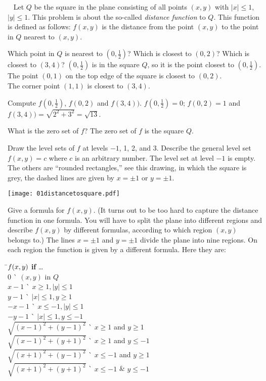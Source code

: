\begin{multicols}{2}
\problem\label{prb:distance-to-square-level-sets}
\carefulnow~
Let $Q$ be the square in the plane consisting of all points $(x,y)$
with $|x|\le1$, $|y|\le1$.  This problem is about the so-called
\emph{distance function} to $Q$.  This function is defined as
follows:  $f(x, y)$ is the distance from the point $(x,y)$ to the
point in $Q$ nearest to $(x,y)$.

\subprob Which point in $Q$ is nearest to $(0, \frac12)$?  Which is
closest to $(0, 2)$?  Which is closest to $(3,4)$?
\answer
$(0, \frac{1} {2})$ is in the square $Q$, so it is the point closest to
$(0, \frac{1} {2})$.\\
The point $(0,1)$ on the top edge of the square is closest to $(0,2)$.\\
The corner point $(1,1)$ is closest to $(3,4)$.
\endanswer

\subprob Compute $f(0, \frac12)$, $f(0,2)$ and $f(3, 4))$.
\answer
$f(0, \frac12) =0 $;
$f(0,2)=1$ and $f(3, 4))=\sqrt{2^2+3^2}=\sqrt{13}$.
\endanswer

\subprob What is the zero set of $f$?
\answer
The zero set of $f$ is the square $Q$.
\endanswer

\subprob Draw the level sets of $f$ at levels $-1$, 1, 2, and 3.  Describe
the general level set $f(x, y) = c$ where $c$ is an arbitrary number.
\answer
The level set at level $-1$ is empty.  The others are ``rounded
rectangles,'' see this drawing, in which the square is grey, the dashed
lines are given by $x=\pm1$ or $y=\pm1$.
\begin{center}
    \texttt{[image: 01distancetosquare.pdf]}
\end{center}
\endanswer

\subprob Give a formula for $f(x, y)$.  (It turns out to be too hard to
capture the distance function in one formula.  You will have to split the
plane into different regions and describe $f(x,y)$ by different formulas,
according to which region $(x,y)$ belongs to.)
\answer
The lines $x=\pm1$ and $y=\pm1$ divide the plane into nine regions.
On each region the function is given by a different formula.
Here they are:
\begin{tabbing}
\=$\boldmath{f(x, y)}$ \=\`\textbf{ if } \ldots \\
\>$0$  \>\` $(x, y)$ in $Q$\\
\>$x-1$ \>\` $x\geq1, |y|\leq 1$\\
\>$y-1$ \>\` $|x|\leq 1, y\geq1$\\
\>$-x-1$ \>\` $x\le-1, |y|\leq 1$\\
\>$-y-1$ \>\` $|x|\leq 1, y\le-1$\\
\>$\sqrt{(x-1)^2+(y-1)^2}$ \>\` $x\ge1$ and $y\ge1$\\
\>$\sqrt{(x-1)^2+(y+1)^2}$ \>\` $x\ge1$ and $y\le-1$\\
\>$\sqrt{(x+1)^2+(y-1)^2}$ \>\` $x\le-1$ and $y\ge1$\\
\>$\sqrt{(x+1)^2+(y+1)^2}$ \>\` $x\le-1$ \& $y\le-1$\\
\end{tabbing}
\endanswer


\end{multicols}
